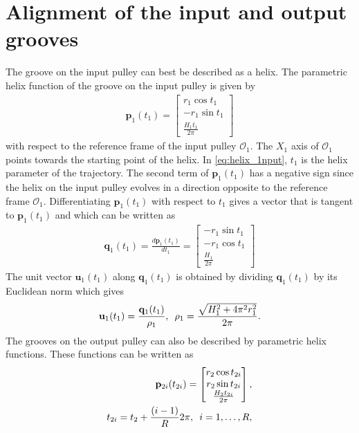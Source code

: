 \documentclass[10pt,cleanfoot]{asme2ej}
\newcommand{\hquad}{\hspace{0.5em}}
\begin{document}
\section{Alignment of the input and output grooves}
 The groove on the input pulley can best be described as a helix. The parametric helix function of the groove on the input pulley is given by 
 \begin{align}
     \mathbf{p}_1(t_1) = \begin{bmatrix}
     r_1\cos t_1\\-r_1\sin t_1\\\frac{H_1t_1}{2\pi}
     \end{bmatrix}
     \label{eq:helix_1nput}
 \end{align}
  with respect to the reference frame of the input pulley $\mathcal{O}_1$. The $X_1$ axis of $\mathcal{O}_1$ points towards the starting point of the helix. In \eqref{eq:helix_1nput},
 $t_1$ is the helix parameter of the trajectory. The second term of $\mathbf{p}_1(t_1)$ has a negative sign since the helix on the input pulley evolves in a direction opposite to the reference frame $\mathcal{O}_1$. Differentiating $\mathbf{p}_1(t_1)$ with respect to $t_1$ gives a vector that is tangent to $\mathbf{p}_1(t_1)$ and which can be written as
 \begin{align}
     \mathbf{q}_1(t_1) = \frac{d\mathbf{p}_1(t_1)}{dt_1} = \begin{bmatrix}
     -r_1\sin t_1\\-r_1\cos t_1\\\frac{H_1}{2\pi}
     \end{bmatrix} 
 \end{align}
 The unit vector $\mathbf{u}_1(t_1)$ along $\mathbf{q}_1(t_1)$ is obtained by dividing $\mathbf{q}_1(t_1)$ by its Euclidean norm which gives
 \begin{align}
     \mathbf{u}_1(t_1) = \frac{\mathbf{q}_1(t_1)}{\rho_1}, \hquad \rho_1 = \frac{\sqrt{H_1^2+4\pi^2r_1^2}}{2\pi}.
 \end{align}
  The grooves on the output pulley can also be described by parametric helix functions. These functions can be written as
  \begin{align}
      \mathbf{p}_{2i}(t_{2i}) = \begin{bmatrix}
      r_2\cos t_{2i}\\
      r_2\sin t_{2i}\\
      \frac{H_2 t_{2i}}{2\pi}
      \end{bmatrix},\\ t_{2i} = t_2+\frac{(i-1)}{R}2\pi, \hquad i =1 ,\ldots , R,
      \label{eq:output_helix}
  \end{align}
\end{document}
